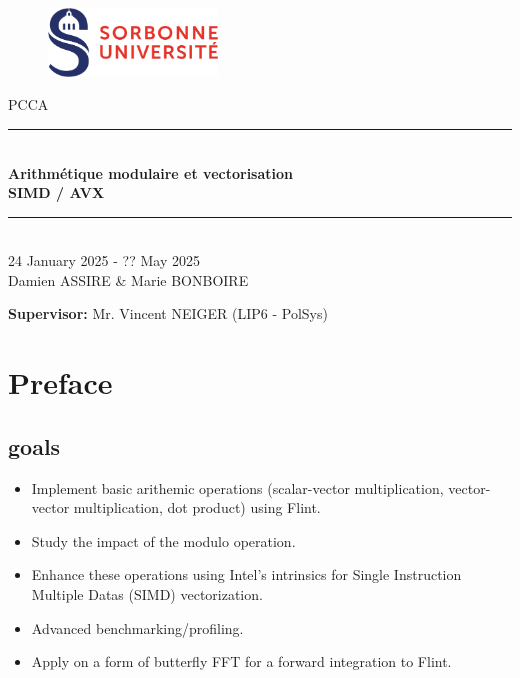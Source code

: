 \documentclass[a4paper]{article}
\begin{document}
\thispagestyle{plain}
\begin{titlepage}
    \begin{figure}[h]
        \centering
        \includegraphics[width=0.4\textwidth]{su.png}
    \end{figure}
    \vspace{1cm}

    \begin{center}
        {\LARGE PCCA}\\[0.3cm]
        \rule{\linewidth}{0.5mm} \\[0.4cm]
        {\huge \textbf{Arithmétique modulaire et vectorisation\\ SIMD / AVX}}\\[0.4cm]
        \rule{\linewidth}{0.5mm} \\[1cm]
        {\large 24 January 2025 - ?? May 2025}\\[3cm]

        {\Large Damien ASSIRE \& Marie BONBOIRE}


    \end{center}

    \vfill
\begin{flushleft}{\large
    \textbf{Supervisor:} Mr. Vincent NEIGER (LIP6 - PolSys)\\
    }
\end{flushleft}
\end{titlepage}
\newpage

\tableofcontents
\newpage

\section{Preface}

\subsection{goals}
\begin{itemize}
    \item Implement basic arithemic operations (scalar-vector multiplication, vector-vector multiplication, dot product) using Flint.
    \item Study the impact of the modulo operation.
    \item Enhance these operations using Intel's intrinsics for Single Instruction Multiple Datas (SIMD) vectorization.
    \item Advanced benchmarking/profiling.
    \item Apply on a form of butterfly FFT for a forward integration to Flint.
\end{itemize}
\end{document}
